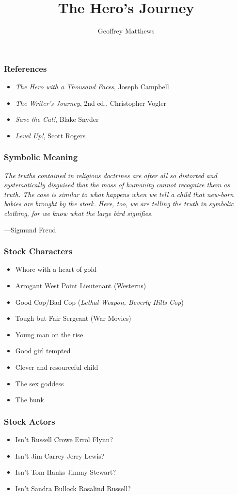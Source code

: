 \documentclass{beamer}
\title{The Hero's Journey}
\author{Geoffrey Matthews}
\institute{Western Washington University}
\newcommand{\bi}{\begin{itemize}}
\newcommand{\ei}{\end{itemize}}
\begin{document}
\begin{frame}[plain]
\titlepage
\end{frame}

\begin{frame}\frametitle{References}
\bi
\item {\em The Hero with a Thousand Faces}, Joseph Campbell
\item {\em The Writer's Journey}, 2nd ed., Christopher Vogler
\item {\em Save the Cat!}, Blake Snyder
\item {\em Level Up!}, Scott Rogers
\ei

\end{frame}
\begin{frame}\frametitle{Symbolic Meaning}
{\sf  \em
The truths contained in religious doctrines are after all so distorted
and systematically disguised that the mass of humanity cannot
recognize them as truth.  The case is similar to what happens when we
tell a child that new-born babies are brought by the stork.  Here,
too, we are telling the truth in symbolic clothing, for we know what
the large bird signifies.

\hfill ---Sigmund Freud
}

\end{frame}
\begin{frame}\frametitle{Stock Characters}

\bi
\item Whore with a heart of gold
\item Arrogant West Point Lieutenant (Westerns)
\item Good Cop/Bad Cop ({\em Lethal Weapon, Beverly Hills Cop})
\item Tough but Fair Sergeant (War Movies)
\item Young man on the rise
\item Good girl tempted
\item Clever and resourceful child
\item The sex goddess
\item The hunk
\ei

\end{frame}
\begin{frame}\frametitle{Stock Actors}
\bi
\item Isn't Russell Crowe  Errol Flynn?
\item Isn't Jim Carrey  Jerry Lewis?
\item Isn't Tom Hanks  Jimmy Stewart?
\item Isn't Sandra Bullock  Rosalind Russell?
\ei


\end{frame}
\end{document}
